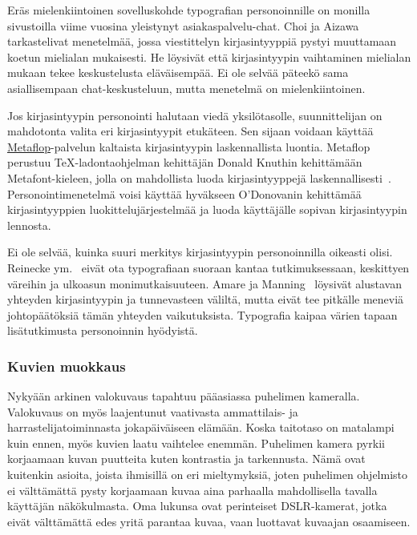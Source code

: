 \documentclass[finnish, 12pt, a4paper, elec, utf8, a-1b, online]{aaltothesis}
\begin{document}
Eräs mielenkiintoinen sovelluskohde typografian personoinnille on monilla
sivustoilla viime vuosina yleistynyt asiakaspalvelu-chat. Choi ja
Aizawa~\cite{choi_aizawa_2018} tarkastelivat menetelmää, jossa viestittelyn
kirjasintyyppiä pystyi muuttamaan koetun mielialan mukaisesti. He löysivät että
kirjasintyypin vaihtaminen mielialan mukaan tekee keskustelusta eläväisempää. Ei
ole selvää päteekö sama asiallisempaan chat-keskusteluun, mutta menetelmä on
mielenkiintoinen.

Jos kirjasintyypin personointi halutaan viedä yksilötasolle, suunnittelijan on
mahdotonta valita eri kirjasintyypit etukäteen. Sen sijaan voidaan käyttää
\href{https://www.metaflop.com/}{Metaflop}-palvelun kaltaista kirjasintyypin
laskennallista luontia. Metaflop perustuu TeX-ladontaohjelman kehittäjän Donald
Knuthin kehittämään Metafont-kieleen, jolla on mahdollista luoda
kirjasintyyppejä laskennallisesti~\cite{knuth_1986}. Personointimenetelmä voisi
käyttää hyväkseen O'Donovanin kehittämää kirjasintyyppien luokittelujärjestelmää
ja luoda käyttäjälle sopivan kirjasintyypin lennosta.

Ei ole selvää, kuinka suuri merkitys kirjasintyypin personoinnilla oikeasti
olisi. Reinecke ym.~\cite{10.1145/2556288.2557052} eivät ota typografiaan
suoraan kantaa tutkimuksessaan, keskittyen väreihin ja ulkoasun
monimutkaisuuteen. Amare ja Manning~\cite{10.1109/IPCC.2012.6408605} löysivät
alustavan yhteyden kirjasintyypin ja tunnevasteen väliltä, mutta eivät tee
pitkälle meneviä johtopäätöksiä tämän yhteyden vaikutuksista. Typografia kaipaa
värien tapaan lisätutkimusta personoinnin hyödyistä.

\subsubsection{Kuvien muokkaus}\label{images-personalization}

Nykyään arkinen valokuvaus tapahtuu pääasiassa puhelimen kameralla. Valokuvaus
on myös laajentunut vaativasta ammattilais- ja harrastelijatoiminnasta
jokapäiväiseen elämään. Koska taitotaso on matalampi kuin ennen, myös kuvien
laatu vaihtelee enemmän. Puhelimen kamera pyrkii korjaamaan kuvan puutteita
kuten kontrastia ja tarkennusta. Nämä ovat kuitenkin asioita, joista ihmisillä
on eri mieltymyksiä, joten puhelimen ohjelmisto ei välttämättä pysty korjaamaan
kuvaa aina parhaalla mahdollisella tavalla käyttäjän näkökulmasta. Oma lukunsa
ovat perinteiset DSLR-kamerat, jotka eivät välttämättä edes yritä parantaa
kuvaa, vaan luottavat kuvaajan osaamiseen.
\end{document}
